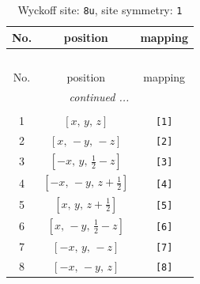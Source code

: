 \documentclass[fleqn,8pt]{jsarticle}
\begin{document}
\renewcommand{\arraystretch}{1.2}
\begin{longtable}{ccc}
\caption{Wyckoff site: {\tt 8u}, site symmetry: {\tt 1}}
 \\
 \hline \hline
No. & position & mapping \\ \hline \endfirsthead

\multicolumn{2}{l}{\tablename\ \thetable{}} \\
 \hline \hline
No. & position & mapping \\ \hline \endhead

 \hline \hline
\multicolumn{2}{r}{\footnotesize\it continued ...} \\ \endfoot

 \hline \hline
\multicolumn{2}{r}{} \\ \endlastfoot

1 & $\left[ x,\, y,\, z \right]$ & {\tt [1]} \\ \hline
2 & $\left[ x,\, - y,\, - z \right]$ & {\tt [2]} \\ \hline
3 & $\left[ - x,\, y,\, \frac{1}{2} - z \right]$ & {\tt [3]} \\ \hline
4 & $\left[ - x,\, - y,\, z + \frac{1}{2} \right]$ & {\tt [4]} \\ \hline
5 & $\left[ x,\, y,\, z + \frac{1}{2} \right]$ & {\tt [5]} \\ \hline
6 & $\left[ x,\, - y,\, \frac{1}{2} - z \right]$ & {\tt [6]} \\ \hline
7 & $\left[ - x,\, y,\, - z \right]$ & {\tt [7]} \\ \hline
8 & $\left[ - x,\, - y,\, z \right]$ & {\tt [8]} \\
\end{longtable}
\end{document}
